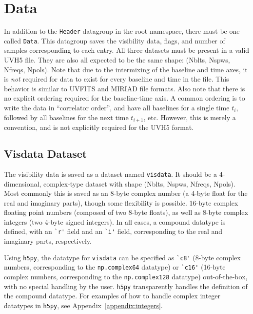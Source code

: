 \documentclass[11pt, oneside]{article}
\begin{document}
\section{Data}
\label{sec:data}
In addition to the \verb+Header+ datagroup in the root namespace, there must be
one called \verb+Data+. This datagroup saves the visibility data, flags, and
number of samples corresponding to each entry. All three datasets must be
present in a valid UVH5 file. They are also all expected to be the same shape:
(Nblts, Nspws, Nfreqs, Npols). Note that due to the intermixing of the baseline
and time axes, it is \textit{not} required for data to exist for every baseline
and time in the file. This behavior is similar to UVFITS and MIRIAD file
formats. Also note that there is no explicit ordering required for the
baseline-time axis. A common ordering is to write the data in ``correlator
order'', and have all baselines for a single time $t_i$, followed by all
baselines for the next time $t_{i+1}$, etc. However, this is merely a
convention, and is not explicitly required for the UVH5 format.

\subsection{Visdata Dataset}
\label{sec:visdata}
The visibility data is saved as a dataset named \verb+visdata+. It should be a
4-dimensional, complex-type dataset with shape (Nblts, Nspws, Nfreqs,
Npols). Most commonly this is saved as an 8-byte complex number (a 4-byte float
for the real and imaginary parts), though some flexibility is possible. 16-byte
complex floating point numbers (composed of two 8-byte floats), as well as
8-byte complex integers (two 4-byte signed integers). In all cases, a compound
datatype is defined, with an \verb+`r'+ field and an \verb+`i'+ field,
corresponding to the real and imaginary parts, respectively.

Using \verb+h5py+, the datatype for \verb+visdata+ can be specified as
\verb+`c8'+ (8-byte complex numbers, corresponding to the \verb+np.complex64+
datatype) or \verb+`c16'+ (16-byte complex numbers, corresponding to the
\verb+np.complex128+ datatype) out-of-the-box, with no special handling by the
user. \verb+h5py+ transparently handles the definition of the compound
datatype. For examples of how to handle complex integer datatypes in
\verb+h5py+, see Appendix~\ref{appendix:integers}.
\end{document}
